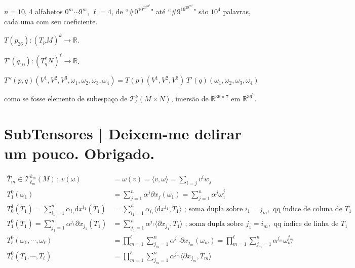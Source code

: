 \documentclass[12pt]{article}
\begin{document}
$n = 10$, 4 alfabetos $0^m \cdots 9^m$, $\ell = 4$, de ``\#$0^10^20^30^4$" at\'e ``\#$9^19^29^39^4$" s\~ao $10^4$ palavras, cada uma com seu coeficiente.

 $T(p_{26}) : (T_pM)^k \rightarrow \mathbb{R} $.

 $T'(q_{10}) : (T_q^*N)^\ell \rightarrow \mathbb{R} $.

 $T''(p, q)(V^1, V^2, V^3, \omega_1, \omega_2, \omega_3, \omega_4) = T(p)(V^1, V^2, V^3)\,T'(q)(\omega_1, \omega_2, \omega_3, \omega_4) $

 como se fosse elemento de subespa\c{c}o de $\mathcal{T}^k_\ell(M \times N)$, imers\~ao de $\mathbb{R}^{36 \times 7}$ em $\mathbb{R}^{36^7}$.

\section{SubTensores | Deixem-me delirar um pouco. Obrigado.}

\begin{align}
  \overline{T}_m \in \mathcal{T}^{k_m}_{\ell_m}(M)\,;\,v(\omega) &= \omega(v) = \langle v, \omega \rangle = \sum_{i = j} v^i w_j \\
  T^0_1(\omega_1) &= \sum_{j = 1}^n \alpha^j \partial x_j (\omega_1) = \sum_{j = 1}^n \alpha^j \omega_1^j \\
  T_0^1 (\overline{T}_1) = \sum_{i_1 = 1}^n \alpha_{i_1} \mathrm{d}x^{i_1} (\overline{T}_1) &= \sum_{i_1 = 1}^n \alpha_{i_1} \langle \mathrm{d}x^{i_1}, \overline{T}_1 \rangle\text{ ; soma dupla sobre } i_1 = j_m, \text{ qq \'indice de coluna de }\overline{T}_1 \\
  T_1^0 (\overline{T}_1) = \sum_{j_1 = 1}^n \alpha^{j_1} \partial x_{j_1} (\overline{T}_1) &= \sum_{j_1 = 1}^n \alpha^{j_1} \langle \partial x_{j_1}, \overline{T}_1 \rangle\text{ ; soma dupla sobre }j_1 = i_m, \text{ qq \'indice de linha de }\overline{T}_1 \\
  T^0_\ell(\omega_1, \cdots, \omega_\ell) &= \prod_{m = 1}^\ell \sum_{j_m = 1}^n \alpha^{j_m} \partial x_{j_m} (\omega_m) = \prod_{m = 1}^\ell \sum_{j_m = 1}^n \alpha^{j_m} \omega_m^{j_m} \\
  T^0_\ell(\overline{T}_1, \cdots, \overline{T}_\ell) &= \prod_{m = 1}^\ell \sum_{j_m = 1}^n \alpha^{j_m} \langle \partial x_{j_m}, \overline{T}_m \rangle
\end{align}
\end{document}
